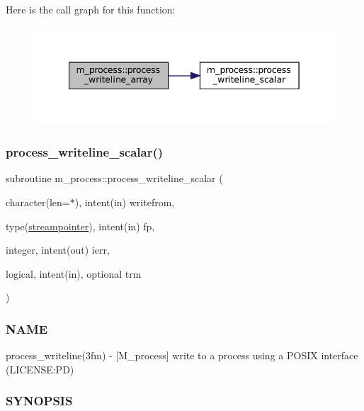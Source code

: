 Here is the call graph for this function\+:
\nopagebreak
\begin{figure}[H]
\begin{center}
\leavevmode
\includegraphics[width=342pt]{namespacem__process_a08887a918eba167ceacddf58ca084270_cgraph}
\end{center}
\end{figure}
\mbox{\label{namespacem__process_a72527c0ec0af26dcb14b8bfad6dcd482}} 
\subsubsection{\texorpdfstring{process\+\_\+writeline\+\_\+scalar()}{process\_writeline\_scalar()}}
{\footnotesize\ttfamily subroutine m\+\_\+process\+::process\+\_\+writeline\+\_\+scalar (\begin{DoxyParamCaption}\item[{character(len=$\ast$), intent(in)}]{writefrom,  }\item[{type(\mbox{\hyperlink{structm__process_1_1streampointer}{streampointer}}), intent(in)}]{fp,  }\item[{integer, intent(out)}]{ierr,  }\item[{logical, intent(in), optional}]{trm }\end{DoxyParamCaption})\hspace{0.3cm}{\ttfamily [private]}}



\subsubsection*{N\+A\+ME}

process\+\_\+writeline(3fm) -\/ \mbox{[}M\+\_\+process\mbox{]} write to a process using a P\+O\+S\+IX interface (L\+I\+C\+E\+N\+SE\+:PD) 

\subsubsection*{S\+Y\+N\+O\+P\+S\+IS}

